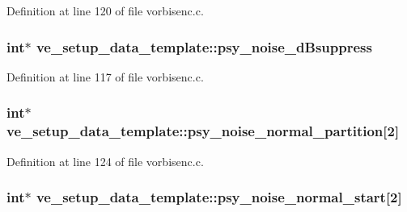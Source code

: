 Definition at line 120 of file vorbisenc.\+c.

\subsubsection[{\texorpdfstring{psy\+\_\+noise\+\_\+d\+Bsuppress}{psy_noise_dBsuppress}}]{ {\bf int}$\ast$ ve\+\_\+setup\+\_\+data\+\_\+template\+::psy\+\_\+noise\+\_\+d\+Bsuppress}\hypertarget{structve__setup__data__template_aa823dca2160d992c5d1f6afb78a4eaf1}{}\label{structve__setup__data__template_aa823dca2160d992c5d1f6afb78a4eaf1}


Definition at line 117 of file vorbisenc.\+c.

\subsubsection[{\texorpdfstring{psy\+\_\+noise\+\_\+normal\+\_\+partition}{psy_noise_normal_partition}}]{ {\bf int}$\ast$ ve\+\_\+setup\+\_\+data\+\_\+template\+::psy\+\_\+noise\+\_\+normal\+\_\+partition\mbox{[}2\mbox{]}}\hypertarget{structve__setup__data__template_a12a6cccfe5870aef136c233391995404}{}\label{structve__setup__data__template_a12a6cccfe5870aef136c233391995404}


Definition at line 124 of file vorbisenc.\+c.

\subsubsection[{\texorpdfstring{psy\+\_\+noise\+\_\+normal\+\_\+start}{psy_noise_normal_start}}]{ {\bf int}$\ast$ ve\+\_\+setup\+\_\+data\+\_\+template\+::psy\+\_\+noise\+\_\+normal\+\_\+start\mbox{[}2\mbox{]}}\hypertarget{structve__setup__data__template_a47f4c1644c2a39cbfd8d812a43506afa}{}\label{structve__setup__data__template_a47f4c1644c2a39cbfd8d812a43506afa}


